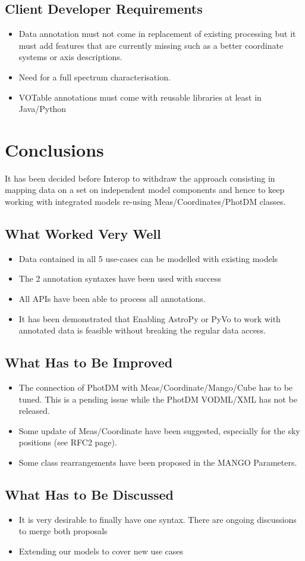 \documentclass[11pt,a4paper]{ivoa}
\begin{document}
\subsection{Client Developer Requirements}

\begin{itemize}
\item Data annotation must not come in replacement of existing processing but it must 
         add features that are currently missing such as a better coordinate systems or axis descriptions.
\item Need for a full spectrum characterisation.
\item VOTable annotations must come with reusable libraries at least in Java/Python
\end{itemize}
 
 
 \section{Conclusions}
 
 It has been decided before Interop to withdraw the approach consisting in mapping data on a set on independent model components and hence to keep working with integrated models re-using Meas/Coordinates/PhotDM classes.
 
\subsection{What Worked Very Well}

\begin{itemize}
\item Data contained in all 5 use-cases can be modelled with existing models
\item The 2 annotation syntaxes have been used with success
\item All  APIs have been able to process all annotations.
\item  It has been demonstrated that Enabling AstroPy or PyVo to work with annotated data is feasible without breaking the regular data access.
\end{itemize}

\subsection{What Has to Be Improved}

\begin{itemize}
\item The connection of PhotDM with Meas/Coordinate/Mango/Cube has to be tuned. This is a pending issue while the PhotDM VODML/XML has not be released.
\item Some update of Meas/Coordinate have been suggested, especially for the sky positions (see RFC2 page).
\item Some class rearrangements have been proposed in the MANGO Parameters.
\end{itemize}

\subsection{What Has to Be Discussed}

\begin{itemize}
\item It is very desirable to finally have one syntax. There are ongoing discussions to merge both proposals 
\item Extending our models to cover new use cases
\end{itemize}
\end{document}
